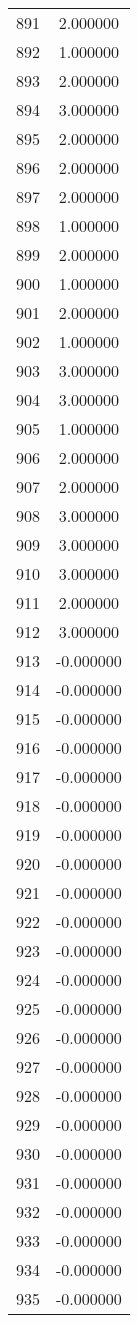 \documentclass[12pt]{article}
\begin{document}
\begin{longtable}{@{}cc@{}}
891 & 2.000000 \\
892 & 1.000000 \\
893 & 2.000000 \\
894 & 3.000000 \\
895 & 2.000000 \\
896 & 2.000000 \\
897 & 2.000000 \\
898 & 1.000000 \\
899 & 2.000000 \\
900 & 1.000000 \\
901 & 2.000000 \\
902 & 1.000000 \\
903 & 3.000000 \\
904 & 3.000000 \\
905 & 1.000000 \\
906 & 2.000000 \\
907 & 2.000000 \\
908 & 3.000000 \\
909 & 3.000000 \\
910 & 3.000000 \\
911 & 2.000000 \\
912 & 3.000000 \\
913 & -0.000000 \\
914 & -0.000000 \\
915 & -0.000000 \\
916 & -0.000000 \\
917 & -0.000000 \\
918 & -0.000000 \\
919 & -0.000000 \\
920 & -0.000000 \\
921 & -0.000000 \\
922 & -0.000000 \\
923 & -0.000000 \\
924 & -0.000000 \\
925 & -0.000000 \\
926 & -0.000000 \\
927 & -0.000000 \\
928 & -0.000000 \\
929 & -0.000000 \\
930 & -0.000000 \\
931 & -0.000000 \\
932 & -0.000000 \\
933 & -0.000000 \\
934 & -0.000000 \\
935 & -0.000000 \\

\end{longtable}
\end{document}
